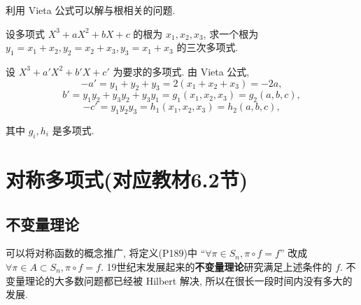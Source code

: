 \documentclass[UTF8]{ctexart}
\begin{document}
利用 Vieta 公式可以解与根相关的问题.
\begin{example}
    设多项式 $X^3+aX^2+bX+c$ 的根为 $x_1,x_2,x_3$, 求一个根为 $y_1=x_1+x_2,y_2=x_2+x_3,y_3=x_1+x_3$ 的三次多项式.
\end{example}
\begin{solution}
    设 $X^3+a'X^2+b'X+c'$ 为要求的多项式. 由 Vieta 公式,
    \[-a'=y_1+y_2+y_3=2(x_1+x_2+x_3)=-2a,\]
    \[b'=y_1y_2+y_3y_2+y_3y_1=g_1(x_1,x_2,x_3)=g_2(a,b,c),\]
    \[-c'=y_1y_2y_3=h_1(x_1,x_2,x_3)=h_2(a,b,c),\]

    其中 $g_i,h_i$ 是多项式.
\end{solution}
\section{对称多项式(对应教材6.2节)}
\subsection{不变量理论}
可以将对称函数的概念推广, 将定义(P189)中 ``$\forall\pi\in S_n,\pi\circ f=f$'' 改成 $\forall\pi\in A\subset S_n,\pi\circ f=f$. 19世纪末发展起来的\textbf{不变量理论}研究满足上述条件的 $f$. 不变量理论的大多数问题都已经被 Hilbert 解决, 所以在很长一段时间内没有多大的发展.
\end{document}
